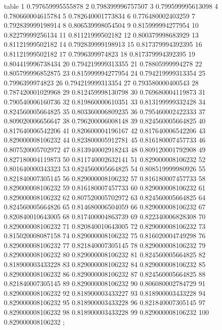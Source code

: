 table {%
	1 0.797659995555878
	2 0.798399996757507
	3 0.799599995613098
	4 0.780660004615784
	5 0.782640001773834
	6 0.776480002403259
	7 0.792839999198914
	8 0.806539998054504
	9 0.815999994277954
	10 0.82279999256134
	11 0.81121999502182
	12 0.800379998683929
	13 0.81121999502182
	14 0.792839999198913
	15 0.817379994392395
	16 0.81121999502182
	17 0.7996399974823
	18 0.817379994392395
	19 0.804419996738434
	20 0.794219999313355
	21 0.78805999994278
	22 0.805799996852875
	23 0.815999994277954
	24 0.794219999313354
	25 0.7996399974823
	26 0.794219999313354
	27 0.793580000400543
	28 0.787420001029968
	29 0.812459998130798
	30 0.769680004119873
	31 0.790540006160736
	32 0.819860000610351
	33 0.813199999332428
	34 0.824560005664825
	35 0.803360006809235
	36 0.795460002422333
	37 0.809020006656647
	38 0.796200006008148
	39 0.824560005664825
	40 0.817640006542206
	41 0.820600004196167
	42 0.817640006542206
	43 0.829000008106232
	44 0.823800005912781
	45 0.816180007457733
	46 0.807520005702972
	47 0.813940002918243
	48 0.809120001792908
	49 0.827180004119873
	50 0.811740002632141
	51 0.829000008106232
	52 0.801640000343323
	53 0.824560005664825
	54 0.808519999980926
	55 0.821840007305145
	56 0.829000008106232
	57 0.816180007457733
	58 0.829000008106232
	59 0.816180007457733
	60 0.829000008106232
	61 0.829000008106232
	62 0.807520005702972
	63 0.824560005664825
	64 0.824560005664826
	65 0.814680006504059
	66 0.829000008106232
	67 0.820840010643005
	68 0.817400004863739
	69 0.822340006828308
	70 0.829000008106232
	71 0.820840010643005
	72 0.829000008106232
	73 0.815020008087158
	74 0.829000008106232
	75 0.816020004749298
	76 0.829000008106232
	77 0.821840007305145
	78 0.829000008106232
	79 0.829000008106232
	80 0.829000008106232
	81 0.824560005664825
	82 0.818900003433228
	83 0.829000008106232
	84 0.829000008106232
	85 0.829000008106232
	86 0.829000008106232
	87 0.824560005664825
	88 0.821840007305145
	89 0.829000008106232
	90 0.806080002784729
	91 0.829000008106232
	92 0.818900003433227
	93 0.818900003433228
	94 0.829000008106232
	95 0.818900003433228
	96 0.821840007305145
	97 0.829000008106232
	98 0.818900003433228
	99 0.829000008106232
	100 0.829000008106232
};
